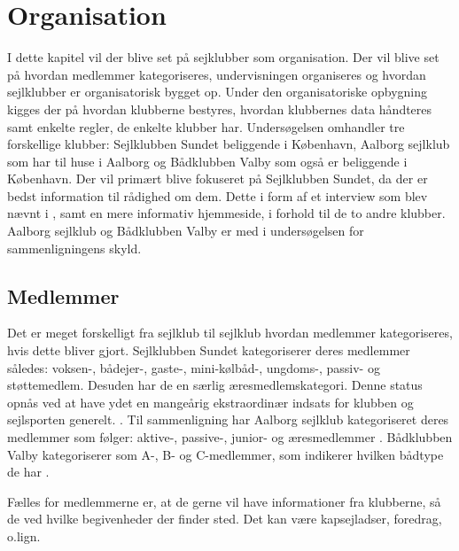 \chapter{Organisation}\label{chap:organisation}

I dette kapitel vil der blive set på sejklubber som organisation. Der vil blive set på hvordan medlemmer kategoriseres,
undervisningen organiseres og hvordan sejlklubber er organisatorisk bygget op. Under den organisatoriske opbygning
kigges der på hvordan klubberne bestyres, hvordan klubbernes data håndteres samt enkelte regler, de enkelte klubber har.
Undersøgelsen omhandler tre forskellige klubber: Sejlklubben Sundet beliggende i København, Aalborg sejlklub som har
til huse i Aalborg og Bådklubben Valby som også er beliggende i København. Der vil primært blive fokuseret på
Sejlklubben Sundet, da der er bedst information til rådighed om dem. Dette i form af et interview som blev nævnt i
, samt en mere informativ hjemmeside, i forhold til de to andre klubber.
Aalborg sejlklub og Bådklubben Valby er med i undersøgelsen for sammenligningens skyld.


\section{Medlemmer}\label{sec:organisation-medlemmer}

Det er meget forskelligt fra sejlklub til sejlklub hvordan medlemmer kategoriseres, hvis dette bliver gjort. Sejlklubben
Sundet kategoriserer deres medlemmer således: voksen-, bådejer-, gaste-, mini-kølbåd-, ungdoms-, passiv- og
støttemedlem. Desuden har de en særlig æresmedlemskategori. Denne status opnås ved at have ydet en mangeårig
ekstraordinær indsats for klubben og sejlsporten generelt. \citep{sundet_vedtaegter}. \newline
Til sammenligning har Aalborg sejlklub kategoriseret deres medlemmer som følger: aktive-, passive-, junior- og
æresmedlemmer \citep{aalborg_sejlklub_vedtaegter}. \newline
Bådklubben Valby kategoriserer som A-, B- og C-medlemmer, som indikerer hvilken bådtype de har
\citep{badklubben_valby_love}.

Fælles for medlemmerne er, at de gerne vil have informationer fra klubberne, så de ved hvilke begivenheder der finder
sted. Det kan være kapsejladser, foredrag, o.lign.


